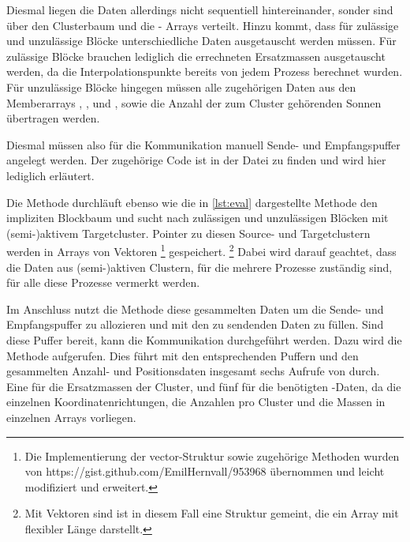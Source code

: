     Diesmal liegen die Daten allerdings nicht sequentiell hintereinander, sonder sind über den Clusterbaum und die - Arrays verteilt. Hinzu kommt, dass für zulässige und unzulässige
    Blöcke unterschiedliche Daten ausgetauscht werden müssen. Für zulässige Blöcke brauchen lediglich die errechneten Ersatzmassen ausgetauscht werden, da die Interpolationspunkte bereits von jedem 
    Prozess berechnet wurden. Für unzulässige Blöcke hingegen müssen alle zugehörigen Daten aus den Memberarrays , ,  und , sowie die Anzahl der zum Cluster gehörenden
    Sonnen übertragen werden.
    
    Diesmal müssen also für die Kommunikation manuell Sende- und Empfangspuffer angelegt werden. Der zugehörige Code ist in der Datei  zu finden und wird hier lediglich erläutert.
    
    Die Methode  durchläuft ebenso wie die in \autoref{lst:eval} dargestellte Methode  den impliziten Blockbaum und sucht nach 
    zulässigen und unzulässigen Blöcken mit (semi-)aktivem Targetcluster. Pointer zu diesen Source- und Targetclustern werden in Arrays von Vektoren \footnote{Die Implementierung der vector-Struktur
    sowie zugehörige Methoden wurden von https://gist.github.com/EmilHernvall/953968 übernommen und leicht modifiziert und erweitert.} gespeichert. \footnote{Mit Vektoren sind ist in diesem Fall eine 
    Struktur gemeint, die ein Array mit flexibler Länge darstellt.} Dabei wird darauf geachtet, dass die Daten aus (semi-)aktiven Clustern, für die mehrere Prozesse zuständig sind, für alle diese 
    Prozesse vermerkt werden.
    
    Im Anschluss nutzt die Methode  diese gesammelten Daten um die Sende- und Empfangspuffer zu allozieren und mit den zu sendenden Daten zu füllen. Sind diese Puffer bereit,
    kann die Kommunikation durchgeführt werden. Dazu wird die Methode  aufgerufen. Dies führt mit den entsprechenden Puffern und den gesammelten Anzahl- und Positionsdaten
    insgesamt sechs Aufrufe von  durch. Eine für die Ersatzmassen der Cluster, und fünf für die benötigten -Daten, da die einzelnen Koordinatenrichtungen, die 
    Anzahlen pro Cluster und die Massen in einzelnen Arrays vorliegen.
    
